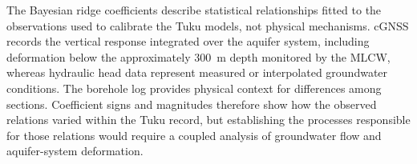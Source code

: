 The Bayesian ridge coefficients describe statistical relationships fitted to the observations used to calibrate the Tuku models, not physical mechanisms. cGNSS records the vertical response integrated over the aquifer system, including deformation below the approximately 300~m depth monitored by the MLCW, whereas hydraulic head data represent measured or interpolated groundwater conditions. The borehole log provides physical context for differences among sections. Coefficient signs and magnitudes therefore show how the observed relations varied within the Tuku record, but establishing the processes responsible for those relations would require a coupled analysis of groundwater flow and aquifer-system deformation.

